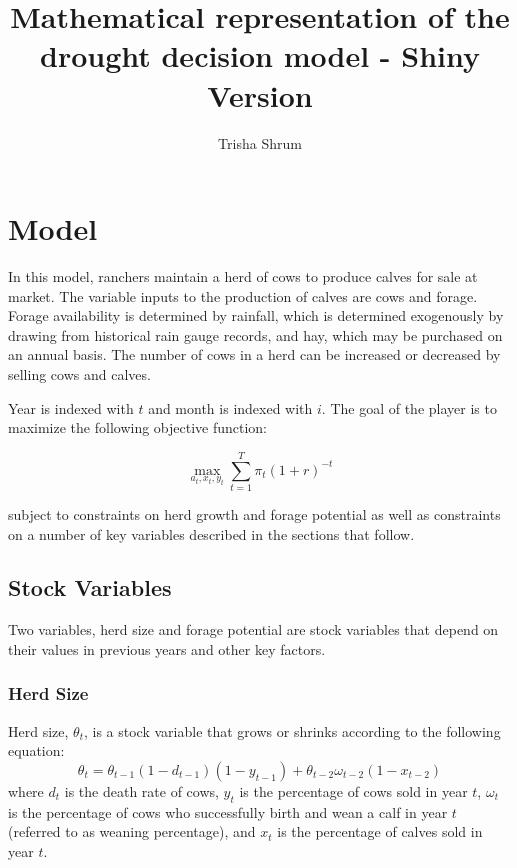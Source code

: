 \documentclass[11pt]{article}
\title{Mathematical representation of the drought decision model - Shiny Version}
\author{Trisha Shrum}
\begin{document}
\maketitle

\section{Model}
In this model, ranchers maintain a herd of cows to produce calves for sale at market. The variable inputs to the production of calves are cows and forage. Forage availability is determined by rainfall, which is determined exogenously by drawing from historical rain gauge records, and hay, which may be purchased on an annual basis. The number of cows in a herd can be increased or decreased by selling cows and calves. 

Year is indexed with $t$ and month is indexed with $i$. The goal of the player is to maximize the following objective function:

\begin{equation}
\label{objFunction}
\max_{a_t, x_t, y_t} \sum_{t=1}^T \pi_t(1+r)^{-t}
\end{equation}

subject to constraints on herd growth and forage potential as well as constraints on a number of key variables described in the sections that follow.

\subsection{Stock Variables}
Two variables, herd size and forage potential are stock variables that depend on their values in previous years and other key factors. 

\subsubsection{Herd Size}
Herd size, $\theta_t$, is a stock variable that grows or shrinks according to the following equation:
\begin{equation}
\label{herdSize}
\theta_t = \theta_{t-1} (1- d_{t-1}) (1 - y_{t-1}) + \theta_{t-2} \omega_{t-2} (1 - x_{t-2})
\end{equation} 
where $d_{t}$ is the death rate of cows, $y_{t}$ is the percentage of cows sold in year $t$, $\omega_t$ is the percentage of cows who successfully birth and wean a calf in year $t$ (referred to as weaning percentage), and $x_t$ is the percentage of calves sold in year $t$. 
\end{document}
